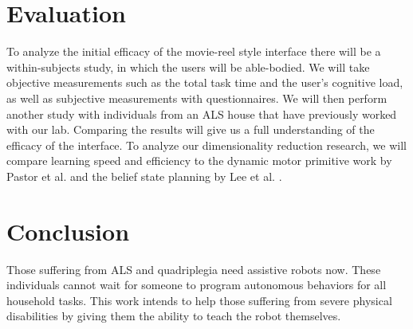 \documentclass{sig-alternate-2013}
\begin{document}

\section{Evaluation}
To analyze the initial efficacy of the movie-reel style interface there will be a within-subjects study, in which the users will be able-bodied. We will take objective measurements such as the total task time and the user's cognitive load, as well as subjective measurements with questionnaires. We will then perform another study with individuals from an ALS house that have previously worked with our lab. Comparing the results will give us a full understanding of the efficacy of the interface. To analyze our dimensionality reduction research, we will compare learning speed and efficiency to the dynamic motor primitive work by Pastor et al. \cite{Pastor_ICRA_2009} and the belief state planning by Lee et al. \cite{Leeetal_IROS2013}.

\section{Conclusion}

Those suffering from ALS and quadriplegia need assistive robots now. These individuals cannot wait for someone to program autonomous behaviors for all household tasks.  This work intends to help those suffering from severe physical disabilities by giving them the ability to teach the robot themselves.
\end{document}
